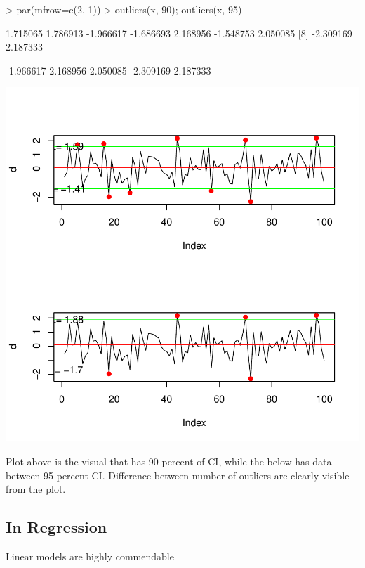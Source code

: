\documentclass{article}
\begin{document}
\begin{Schunk}
\begin{Sinput}
> par(mfrow=c(2, 1))
> outliers(x, 90); outliers(x, 95)
\end{Sinput}
\begin{Soutput}
[1]  1.715065  1.786913 -1.966617 -1.686693  2.168956 -1.548753  2.050085
[8] -2.309169  2.187333
\end{Soutput}
\begin{Soutput}
[1] -1.966617  2.168956  2.050085 -2.309169  2.187333
\end{Soutput}
\end{Schunk}
\includegraphics{outliers-004}

Plot above is the visual that has 90 percent of CI, while the below has data between 95 percent CI. Difference between number of outliers are clearly visible from the plot. 

\subsection{In Regression}

Linear models are highly commendable 
\end{document}

